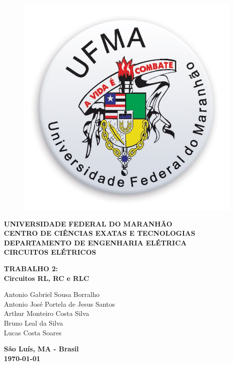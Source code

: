 \documentclass[
	12pt,				%
	oneside,			%
	a4paper,			%
	english,			%
	french,				%
	spanish,			%
	brazil				%
	]{abntex2}
\begin{document}

\frenchspacing 

\pretextual
\begin{center}			
	\begin{figure}[htb]
		\centering
		\includegraphics[scale=0.15]{ufmalogo.jpg}
	\end{figure}
				
			\textbf{UNIVERSIDADE FEDERAL DO MARANHÃO \\
					CENTRO DE CIÊNCIAS EXATAS E TECNOLOGIAS \\
					DEPARTAMENTO DE ENGENHARIA ELÉTRICA \\
				    CIRCUITOS ELÉTRICOS\\\vspace{4cm}}
					
					\textbf{\large{TRABALHO 2:}\\
					\large{Circuitos RL, RC e RLC}}
					\vspace{3.5cm}
					\begin{flushright}
						\textnormal{Antonio Gabriel Sousa Borralho \\ Antonio José Portela de Jesus Santos \\ Arthur Monteiro Costa Silva \\ Bruno Leal da Silva \\ Lucas Costa Soares}
					\end{flushright}
					\vspace{3.5cm}
					\textbf{São Luís, MA - Brasil\\ \today}
\end{center}
\end{document}
